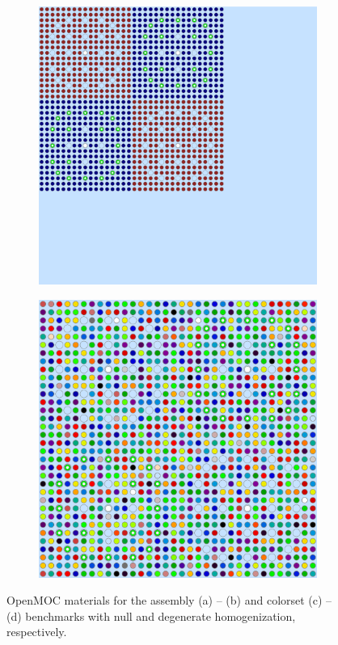 \begin{figure}[h!]
\begin{subfigure}{0.45\textwidth}
  \centering
  \includegraphics[width=0.8\linewidth]{figures/reflector/geometry}
  \caption{}
  \label{fig:null-reflector}
\end{subfigure}
\begin{subfigure}{0.45\textwidth}
  \centering
  \includegraphics[width=0.8\linewidth]{figures/reflector/degenerate-materials}
  \caption{}
  \label{fig:degenerate-reflector}
\end{subfigure}
\caption{OpenMOC materials for the assembly (a) -- (b) and colorset (c) -- (d) benchmarks with null and degenerate homogenization, respectively.}
\label{fig:benchmarks}
\end{figure}

